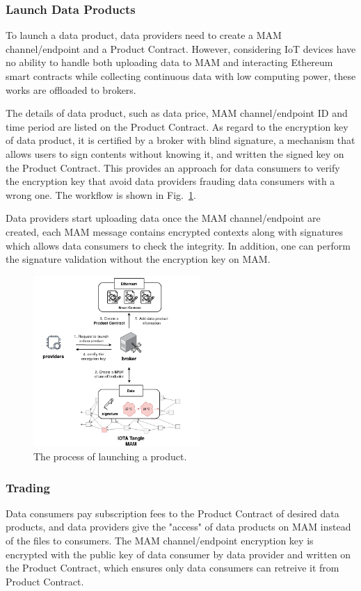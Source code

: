 \documentclass[conference]{IEEEtran}
\begin{document}
\subsubsection{Launch Data Products}
To launch a data product, data providers need to create a MAM channel/endpoint and a Product Contract. However, considering IoT devices have no ability to handle both uploading data to MAM and interacting Ethereum smart contracts while collecting continuous data with low computing power, these works are offloaded to brokers. 

The details of data product, such as data price, MAM channel/endpoint ID and time period are listed on the Product Contract. As regard to the encryption key of data product, it is certified by a broker with blind signature\cite{blindSig}, a mechanism that allows users to sign contents without knowing it, and written the signed key on the Product Contract. This provides an approach for data consumers to verify the encryption key that avoid data providers frauding data consumers with a wrong one. The workflow is shown in Fig.~\ref{fig:launching_product}. 

Data providers start uploading data once the MAM channel/endpoint are created, each MAM message contains encrypted contexts along with signatures which allows data consumers to check the integrity. In addition, one can perform the signature validation without the encryption key on MAM.
 
\begin{figure}[!t]
    \centering
    \includegraphics[width=2.5in]{launching_product}
    \caption{The process of launching a product.}
    \label{fig:launching_product}
\end{figure}

\subsubsection{Trading}
Data consumers pay subscription fees to the Product Contract of desired data products, and data providers give the "access" of data products on MAM instead of the files to consumers. The MAM channel/endpoint encryption key is encrypted with the public key of data consumer by data provider and written on the Product Contract, which ensures only data consumers can retreive it from Product Contract. 
\end{document}
